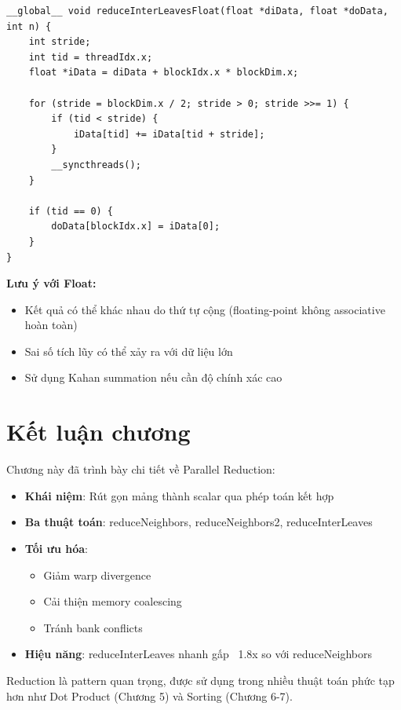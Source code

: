 \begin{lstlisting}[caption={Parallel Reduction với kiểu Float}, label={lst:float_reduction}]
__global__ void reduceInterLeavesFloat(float *diData, float *doData, int n) {
    int stride;
    int tid = threadIdx.x;
    float *iData = diData + blockIdx.x * blockDim.x;
    
    for (stride = blockDim.x / 2; stride > 0; stride >>= 1) {
        if (tid < stride) {
            iData[tid] += iData[tid + stride];
        }
        __syncthreads();
    }
    
    if (tid == 0) {
        doData[blockIdx.x] = iData[0];
    }
}
\end{lstlisting}

\textbf{Lưu ý với Float:}
\begin{itemize}
    \item Kết quả có thể khác nhau do thứ tự cộng (floating-point không associative hoàn toàn)
    \item Sai số tích lũy có thể xảy ra với dữ liệu lớn
    \item Sử dụng Kahan summation nếu cần độ chính xác cao
\end{itemize}

\section{Kết luận chương}

Chương này đã trình bày chi tiết về Parallel Reduction:

\begin{itemize}
    \item \textbf{Khái niệm}: Rút gọn mảng thành scalar qua phép toán kết hợp
    \item \textbf{Ba thuật toán}: reduceNeighbors, reduceNeighbors2, reduceInterLeaves
    \item \textbf{Tối ưu hóa}: 
        \begin{itemize}
            \item Giảm warp divergence
            \item Cải thiện memory coalescing
            \item Tránh bank conflicts
        \end{itemize}
    \item \textbf{Hiệu năng}: reduceInterLeaves nhanh gấp ~1.8x so với reduceNeighbors
\end{itemize}

Reduction là pattern quan trọng, được sử dụng trong nhiều thuật toán phức tạp hơn như Dot Product (Chương 5) và Sorting (Chương 6-7).
